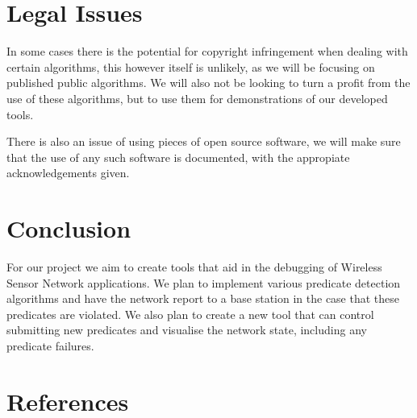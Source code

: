 \documentclass[a4paper]{article}
\begin{document}
\section{Legal Issues}
In some cases there is the potential for copyright infringement when dealing with certain algorithms, this however itself is unlikely, as we will be focusing on published public algorithms. We will also not be looking to turn a profit from the use of these algorithms, but to use them for demonstrations of our developed tools.

There is also an issue of using pieces of open source software, we will make sure that the use of any such software is documented, with the appropiate acknowledgements given.

\section{Conclusion}

For our project we aim to create tools that aid in the debugging of Wireless Sensor Network applications. We plan to implement various predicate detection algorithms and have the network report to a base station in the case that these predicates are violated. We also plan to create a new tool that can control submitting new predicates and visualise the network state, including any predicate failures.

\clearpage

\appendixpage
\addappheadtotoc
\appendix


\section{References}
\renewcommand{\refname}{\vspace{-1cm}}


\end{document}
